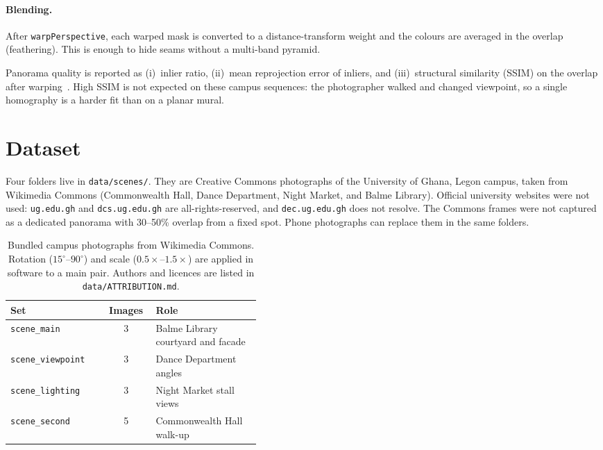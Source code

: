 \documentclass[10pt,twocolumn,letterpaper]{article}
\begin{document}
\paragraph{Blending.}
After \texttt{warpPerspective}, each warped mask is converted to a distance-transform weight and the colours are averaged in the overlap (feathering). This is enough to hide seams without a multi-band pyramid.

Panorama quality is reported as (i)~inlier ratio, (ii)~mean reprojection error of inliers, and (iii)~structural similarity (SSIM) on the overlap after warping~\cite{wang2004ssim}. High SSIM is not expected on these campus sequences: the photographer walked and changed viewpoint, so a single homography is a harder fit than on a planar mural.

\section{Dataset}

Four folders live in \texttt{data/scenes/}. They are Creative Commons photographs of the University of Ghana, Legon campus, taken from Wikimedia Commons (Commonwealth Hall, Dance Department, Night Market, and Balme Library). Official university websites were not used: \texttt{ug.edu.gh} and \texttt{dcs.ug.edu.gh} are all-rights-reserved, and \texttt{dec.ug.edu.gh} does not resolve. The Commons frames were not captured as a dedicated panorama with 30--50\% overlap from a fixed spot. Phone photographs can replace them in the same folders.

\begin{table}[t]
\centering
\setlength{\tabcolsep}{3.2pt}
{\small
\begin{tabular}{|l|c|p{0.42\linewidth}|}
\hline
Set & Images & Role \\
\hline\hline
\texttt{scene\_main} & 3 & Balme Library courtyard and facade \\
\texttt{scene\_viewpoint} & 3 & Dance Department angles \\
\texttt{scene\_lighting} & 3 & Night Market stall views \\
\texttt{scene\_second} & 5 & Commonwealth Hall walk-up \\
\hline
\end{tabular}
}
\caption{Bundled campus photographs from Wikimedia Commons. Rotation ($15^\circ$--$90^\circ$) and scale ($0.5\times$--$1.5\times$) are applied in software to a main pair. Authors and licences are listed in \texttt{data/ATTRIBUTION.md}.}
\label{tab:data}
\end{table}
\end{document}
